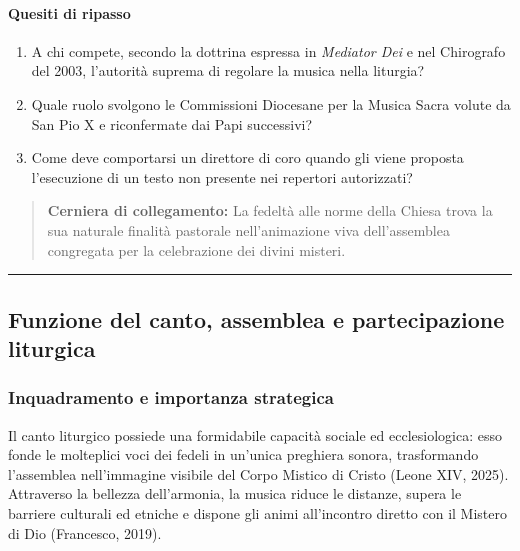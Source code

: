 \documentclass[12pt,a4paper]{article}
\begin{document}
	\paragraph{Quesiti di ripasso}\label{quesiti-di-ripasso}
	
	\begin{enumerate}[label=\arabic*.,leftmargin=*]
		\item A chi compete, secondo la dottrina espressa in \emph{Mediator Dei} e nel Chirografo del 2003, l'autorità suprema di regolare la musica nella liturgia?
		\item Quale ruolo svolgono le Commissioni Diocesane per la Musica Sacra volute da San Pio X e riconfermate dai Papi successivi?
		\item Come deve comportarsi un direttore di coro quando gli viene proposta l'esecuzione di un testo non presente nei repertori autorizzati?
	\end{enumerate}
	
	\begin{quote}
		\textbf{Cerniera di collegamento:} La fedeltà alle norme della Chiesa trova la sua naturale finalità pastorale nell'animazione viva dell'assemblea congregata per la celebrazione dei divini misteri.
	\end{quote}
	
	\begin{center}\rule{0.5\linewidth}{0.5pt}\end{center}
	
	\subsection{Funzione del canto, assemblea e partecipazione liturgica}\label{funzione-del-canto-assemblea-e-partecipazione-liturgica}
	
	\subsubsection{Inquadramento e importanza strategica}\label{inquadramento-e-importanza-strategica-4}
	
	Il canto liturgico possiede una formidabile capacità sociale ed ecclesiologica: esso fonde le molteplici voci dei fedeli in un'unica preghiera sonora, trasformando l'assemblea nell'immagine visibile del Corpo Mistico di Cristo (Leone XIV, 2025). Attraverso la bellezza dell'armonia, la musica riduce le distanze, supera le barriere culturali ed etniche e dispone gli animi all'incontro diretto con il Mistero di Dio (Francesco, 2019).
	
\end{document}
